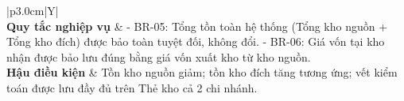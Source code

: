 \documentclass[12pt,a4paper]{report}
\renewcommand{\_}{\textunderscore\allowbreak}
\begin{document}
\begin{table}[H]
\begin{tabularx}{\textwidth}{|p{3.0cm}|Y|}
{} \\
\hline
\textbf{Quy tắc nghiệp vụ} & - BR-05: Tổng tồn toàn hệ thống (Tổng kho nguồn + Tổng kho đích) được bảo toàn tuyệt đối, không đổi.\newline
- BR-06: Giá vốn tại kho nhận được bảo lưu đúng bằng giá vốn xuất kho từ kho nguồn. \\
\hline
\textbf{Hậu điều kiện} & Tồn kho nguồn giảm; tồn kho đích tăng tương ứng; vết kiểm toán được lưu đầy đủ trên Thẻ kho cả 2 chi nhánh. \\
\hline
\end{tabularx}
\caption{Bảng đặc tả Use Case UC-03: Điều chuyển Kho Nội bộ Liên Chi nhánh}
\label{tab:uc_spec_chuyenkho}
\end{table}

\clearpage
\end{document}
